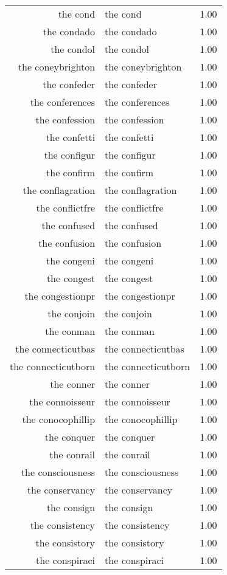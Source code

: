 \begin{table}[ht]
\begin{tabular}{rlr}
  the cond & the cond & 1.00 \\ 
  the condado & the condado & 1.00 \\ 
  the condol & the condol & 1.00 \\ 
  the coneybrighton & the coneybrighton & 1.00 \\ 
  the confeder & the confeder & 1.00 \\ 
  the conferences & the conferences & 1.00 \\ 
  the confession & the confession & 1.00 \\ 
  the confetti & the confetti & 1.00 \\ 
  the configur & the configur & 1.00 \\ 
  the confirm & the confirm & 1.00 \\ 
  the conflagration & the conflagration & 1.00 \\ 
  the conflictfre & the conflictfre & 1.00 \\ 
  the confused & the confused & 1.00 \\ 
  the confusion & the confusion & 1.00 \\ 
  the congeni & the congeni & 1.00 \\ 
  the congest & the congest & 1.00 \\ 
  the congestionpr & the congestionpr & 1.00 \\ 
  the conjoin & the conjoin & 1.00 \\ 
  the conman & the conman & 1.00 \\ 
  the connecticutbas & the connecticutbas & 1.00 \\ 
  the connecticutborn & the connecticutborn & 1.00 \\ 
  the conner & the conner & 1.00 \\ 
  the connoisseur & the connoisseur & 1.00 \\ 
  the conocophillip & the conocophillip & 1.00 \\ 
  the conquer & the conquer & 1.00 \\ 
  the conrail & the conrail & 1.00 \\ 
  the consciousness & the consciousness & 1.00 \\ 
  the conservancy & the conservancy & 1.00 \\ 
  the consign & the consign & 1.00 \\ 
  the consistency & the consistency & 1.00 \\ 
  the consistory & the consistory & 1.00 \\ 
  the conspiraci & the conspiraci & 1.00 \\ 

\end{tabular}
\end{table}
